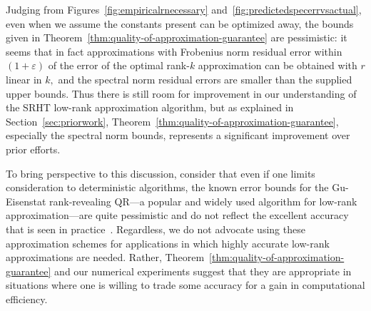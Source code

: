  Judging from Figures~\ref{fig:empiricalrnecessary} and~\ref{fig:predictedspecerrvsactual}, even when we assume the constants present can be optimized away, the bounds given in Theorem~\ref{thm:quality-of-approximation-guarantee}
 are pessimistic: it seems that in fact approximations with Frobenius norm residual error within $(1+\varepsilon)$ of the error of the
 optimal rank-$k$ approximation can be obtained with $r$ linear in $k,$ and the spectral norm residual errors are smaller than the supplied upper bounds.
 Thus there is still room for improvement in our understanding of the SRHT low-rank approximation algorithm, but as explained in Section~\ref{sec:priorwork},
 Theorem~\ref{thm:quality-of-approximation-guarantee}, especially the spectral norm bounds, represents a significant improvement over prior efforts.

To bring perspective to this discussion, consider that even if one limits consideration to deterministic algorithms, the
known error bounds for the Gu-Eisenstat rank-revealing QR---a popular and widely used algorithm for low-rank approximation---are quite pessimistic and do not reflect the
excellent accuracy that is seen in practice~\cite{GE96}. Regardless, we do not advocate using these approximation schemes for applications in which highly accurate low-rank approximations are needed. Rather, Theorem~\ref{thm:quality-of-approximation-guarantee} and our numerical experiments suggest that they are appropriate in situations where one is willing to trade some accuracy for a gain in computational efficiency.

